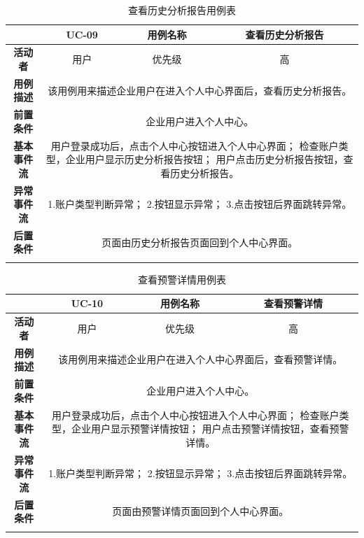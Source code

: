 \begin{longtable}[c]{c|ccc}
	\caption{查看历史分析报告用例表}
	\label{tab:tab9}\\
	\shline
	\multicolumn{1}{c|}{\textbf{用例编号}} & \multicolumn{1}{c|}{UC-09} & \multicolumn{1}{c|}{用例名称} &  查看历史分析报告\\ \hline
	\endhead
	\multicolumn{1}{c|}{\textbf{活动者}} & \multicolumn{1}{c|}{用户} & \multicolumn{1}{c|}{优先级} &高  \\ \hline
	\textbf{用例描述} & \multicolumn{3}{p{12cm}}{该用例用来描述企业用户在进入个人中心界面后，查看历史分析报告。} \\ \hline
	\textbf{前置条件}& \multicolumn{3}{p{12cm}}{企业用户进入个人中心。} \\ \hline
	\textbf{基本事件流}& \multicolumn{3}{p{12cm}}{用户登录成功后，点击个人中心按钮进入个人中心界面；\newline
	    检查账户类型，企业用户显示历史分析报告按钮；\newline
	    用户点击历史分析报告按钮，查看历史分析报告。} \\ \hline
	\textbf{异常事件流}& \multicolumn{3}{p{12cm}}{1.账户类型判断异常；\newline
	    2.按钮显示异常；\newline
	    3.点击按钮后界面跳转异常。
	} \\ \hline
	\textbf{后置条件}& \multicolumn{3}{p{12cm}}{页面由历史分析报告页面回到个人中心界面。} \\ \shline
\end{longtable}

\begin{longtable}[c]{c|ccc}
	\caption{查看预警详情用例表}
	\label{tab:tab10}\\
	\shline
	\multicolumn{1}{c|}{\textbf{用例编号}} & \multicolumn{1}{c|}{UC-10} & \multicolumn{1}{c|}{用例名称} &  查看预警详情\\ \hline
	\endhead
	\multicolumn{1}{c|}{\textbf{活动者}} & \multicolumn{1}{c|}{用户} & \multicolumn{1}{c|}{优先级} &高  \\ \hline
	\textbf{用例描述} & \multicolumn{3}{p{12cm}}{该用例用来描述企业用户在进入个人中心界面后，查看预警详情。} \\ \hline
	\textbf{前置条件}& \multicolumn{3}{p{12cm}}{企业用户进入个人中心。} \\ \hline
	\textbf{基本事件流}& \multicolumn{3}{p{12cm}}{用户登录成功后，点击个人中心按钮进入个人中心界面；\newline
	    检查账户类型，企业用户显示预警详情按钮；\newline
	    用户点击预警详情按钮，查看预警详情。} \\ \hline
	\textbf{异常事件流}& \multicolumn{3}{p{12cm}}{1.账户类型判断异常；\newline
	    2.按钮显示异常；\newline
	    3.点击按钮后界面跳转异常。
	} \\ \hline
	\textbf{后置条件}& \multicolumn{3}{p{12cm}}{页面由预警详情页面回到个人中心界面。} \\ \shline
\end{longtable}

